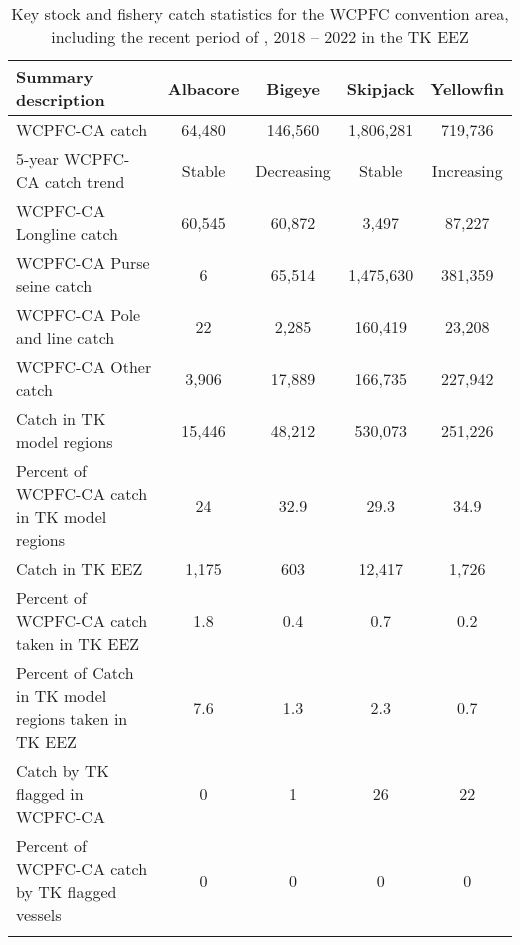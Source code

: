 \begin{longtable}{lcccc}
\caption{Key stock and fishery catch statistics for the WCPFC convention area, including the recent period of , 2018 -- 2022 in the TK EEZ} \\ 
  \hline
Summary description & Albacore & Bigeye & Skipjack & Yellowfin \\ 
  \hline
WCPFC-CA catch & 64,480 & 146,560 & 1,806,281 & 719,736 \\ 
  5-year WCPFC-CA catch trend & Stable & Decreasing & Stable & Increasing \\ 
  WCPFC-CA Longline catch & 60,545 & 60,872 & 3,497 & 87,227 \\ 
  WCPFC-CA Purse seine catch & 6 & 65,514 & 1,475,630 & 381,359 \\ 
  WCPFC-CA Pole and line catch & 22 & 2,285 & 160,419 & 23,208 \\ 
  WCPFC-CA Other catch & 3,906 & 17,889 & 166,735 & 227,942 \\ 
  Catch in TK model regions & 15,446 & 48,212 & 530,073 & 251,226 \\ 
  Percent of WCPFC-CA catch in TK model regions & 24 & 32.9 & 29.3 & 34.9 \\ 
   \hline
Catch in TK EEZ & 1,175 & 603 & 12,417 & 1,726 \\ 
  Percent of WCPFC-CA catch taken in TK EEZ & 1.8 & 0.4 & 0.7 & 0.2 \\ 
  Percent of Catch in TK model regions taken in TK EEZ & 7.6 & 1.3 & 2.3 & 0.7 \\ 
  Catch by TK flagged in WCPFC-CA & 0 & 1 & 26 & 22 \\ 
  Percent of WCPFC-CA catch by TK flagged vessels & 0 & 0 & 0 & 0 \\ 
  \hline
\label{cat_sum_tab}
\end{longtable}
